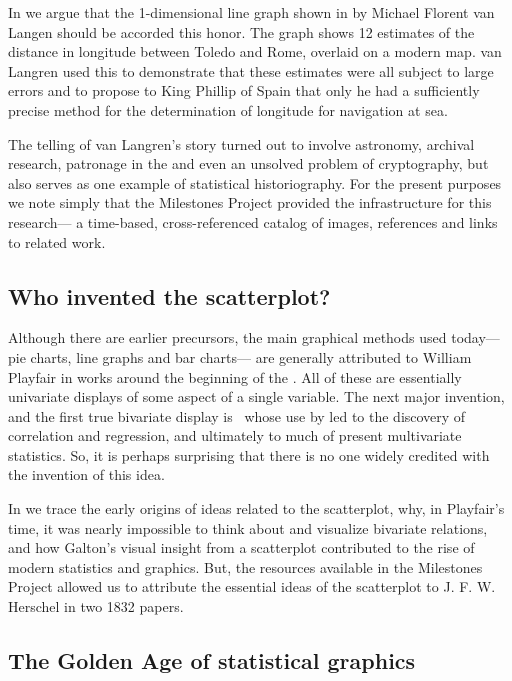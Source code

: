 In \citet{Friendly-etal:2010:langren}
we argue that the 1-dimensional line graph shown in 
by Michael Florent
van Langen \citep{Langren:1644} should be accorded this honor.
The graph shows 12 estimates of the distance in longitude between Toledo and Rome, overlaid on a modern map.
van Langren used this to demonstrate that these estimates were all subject to large errors and to
propose to King Phillip of Spain that only he had a sufficiently precise method for the determination
of longitude for navigation at sea.

The telling of van Langren's story turned out to involve astronomy, archival research,
patronage in the  and even an unsolved problem of cryptography,
but also serves as one example of statistical historiography.  For the present purposes
we note simply that the Milestones Project provided the infrastructure for this research---
a time-based, cross-referenced catalog of images, references and links to related work.

\subsection{Who invented the scatterplot?}
Although there are earlier precursors, the main graphical methods used today---
pie charts, line graphs and bar charts--- are generally attributed to
William Playfair in works around the beginning of the 
\citep{Playfair:1786,Playfair:1801}. All of these are essentially univariate
displays of some aspect of a single variable. The next major invention,
and the first true bivariate display is \scat\, whose use by
\citet{Galton:1886} led to the discovery of
correlation and regression, and ultimately to much of present multivariate
statistics. So, it is perhaps surprising that there is no one widely
credited with the invention of this idea.

In \citet{FriendlyDenis:05:scat} we trace the early origins of ideas related to
the scatterplot, why, in Playfair's time, it was nearly impossible to think about
and visualize bivariate relations, and how Galton's visual insight from
a scatterplot contributed to the rise of modern statistics and graphics.
But, the resources available in the Milestones Project allowed us to attribute
the essential ideas of the scatterplot to J. F. W. Herschel in two 1832 papers.

\subsection{The Golden Age of statistical graphics}

